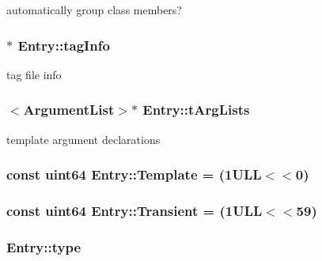 automatically group class members? 

\hypertarget{class_entry_a0e6301ae1fd7d56d928e1ef7672d4ede}{}
\subsubsection[{tag\+Info}]{$\ast$ Entry\+::tag\+Info}\label{class_entry_a0e6301ae1fd7d56d928e1ef7672d4ede}


tag file info 

\hypertarget{class_entry_a6fe1bee76d0edf07bdae161814b8e490}{}
\subsubsection[{t\+Arg\+Lists}]{$<${\bf Argument\+List}$>$$\ast$ Entry\+::t\+Arg\+Lists}\label{class_entry_a6fe1bee76d0edf07bdae161814b8e490}


template argument declarations 

\hypertarget{class_entry_ae239a5ac21792686fed8a38e2dd49161}{}
\subsubsection[{Template}]{\setlength{\rightskip}{0pt plus 5cm}const {\bf uint64} Entry\+::\+Template = (1\+U\+L\+L$<$$<$0)\hspace{0.3cm}{\ttfamily [static]}}\label{class_entry_ae239a5ac21792686fed8a38e2dd49161}
\hypertarget{class_entry_a4002f093ccd2b3d3c78c443135757cee}{}
\subsubsection[{Transient}]{\setlength{\rightskip}{0pt plus 5cm}const {\bf uint64} Entry\+::\+Transient = (1\+U\+L\+L$<$$<$59)\hspace{0.3cm}{\ttfamily [static]}}\label{class_entry_a4002f093ccd2b3d3c78c443135757cee}
\hypertarget{class_entry_a79a9b5736630c3769e645f71dc357b9f}{}
\subsubsection[{type}]{ Entry\+::type}\label{class_entry_a79a9b5736630c3769e645f71dc357b9f}


